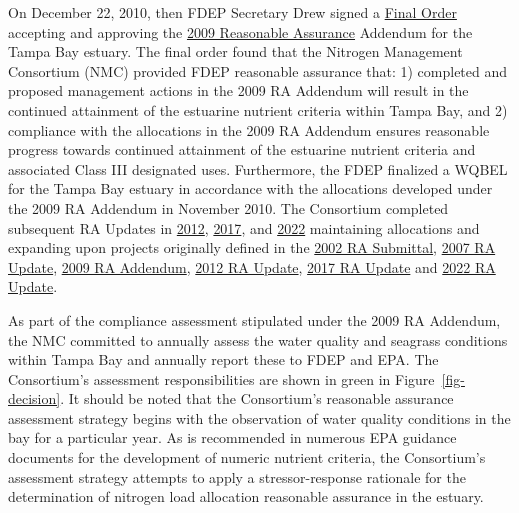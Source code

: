 \documentclass[
  letterpaper,
  DIV=11,
  numbers=noendperiod]{scrreport}
\begin{document}
On December 22, 2010, then FDEP Secretary Drew signed a
\href{https://drive.google.com/file/d/1wV3w8ack_fLNK3yS-xTR7LTmziNtZ8CN/view?usp=share_link}{Final
Order} accepting and approving the
\href{https://drive.google.com/file/d/10IjJAfcGFf007a5VdPXAUtUi4dx-cmsA/view?usp=drivesdk}{2009
Reasonable Assurance} Addendum for the Tampa Bay estuary. The final
order found that the Nitrogen Management Consortium (NMC) provided FDEP
reasonable assurance that: 1) completed and proposed management actions
in the 2009 RA Addendum will result in the continued attainment of the
estuarine nutrient criteria within Tampa Bay, and 2) compliance with the
allocations in the 2009 RA Addendum ensures reasonable progress towards
continued attainment of the estuarine nutrient criteria and associated
Class III designated uses. Furthermore, the FDEP finalized a WQBEL for
the Tampa Bay estuary in accordance with the allocations developed under
the 2009 RA Addendum in November 2010. The Consortium completed
subsequent RA Updates in
\href{https://tbep.org/reasonable-assurance-plans-updates-2012/}{2012},
\href{https://tbep.org/reasonable-assurance-plans-updates-2017/}{2017},
and
\href{https://drive.google.com/file/d/18HHMx4U6vHNrFyepEFuoTJ_sEKyTA_gu/view?usp=share_link}{2022}
maintaining allocations and expanding upon projects originally defined
in the
\href{https://tbep.org/reasonable-assurance-plans-updates-2002/}{2002 RA
Submittal},
\href{https://tbep.org/reasonable-assurance-plans-updates-2007/}{2007 RA
Update},
\href{https://drive.google.com/file/d/10IjJAfcGFf007a5VdPXAUtUi4dx-cmsA/view?usp=drivesdk}{2009
RA Addendum},
\href{https://drive.google.com/file/d/1F_QmQcvGVQ78wK3jcMLMGmjs1vJ21nto/view?usp=share_link}{2012
RA Update},
\href{https://drive.google.com/file/d/1VdYE67_aZAhFq6JYQSKxx2WY2O5KwyUI/view?usp=share_link}{2017
RA Update} and
\href{https://drive.google.com/file/d/18HHMx4U6vHNrFyepEFuoTJ_sEKyTA_gu/view?usp=share_link}{2022
RA Update}.

As part of the compliance assessment stipulated under the 2009 RA
Addendum, the NMC committed to annually assess the water quality and
seagrass conditions within Tampa Bay and annually report these to FDEP
and EPA. The Consortium's assessment responsibilities are shown in green
in Figure~\ref{fig-decision}. It should be noted that the Consortium's
reasonable assurance assessment strategy begins with the observation of
water quality conditions in the bay for a particular year. As is
recommended in numerous EPA guidance documents for the development of
numeric nutrient criteria, the Consortium's assessment strategy attempts
to apply a stressor-response rationale for the determination of nitrogen
load allocation reasonable assurance in the estuary.
\end{document}
